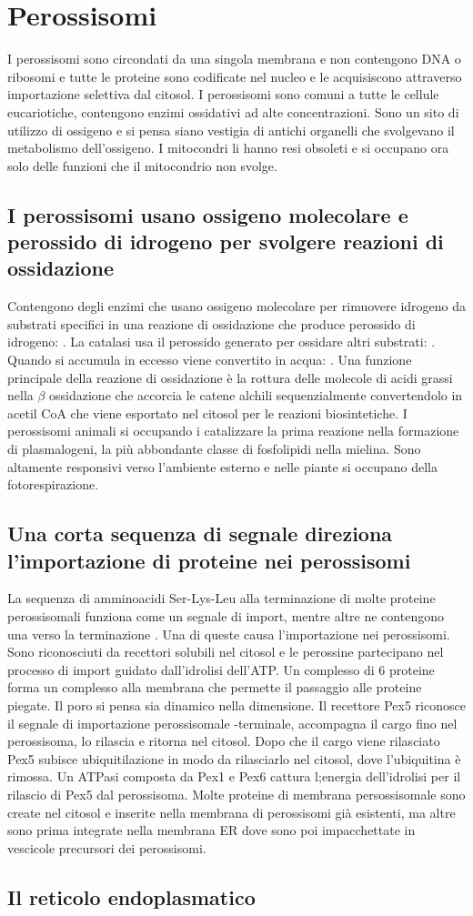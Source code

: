 \section{Perossisomi}
I perossisomi sono circondati da una singola membrana e non contengono DNA o ribosomi e tutte le proteine sono codificate nel nucleo e le acquisiscono attraverso importazione selettiva
dal citosol. I perossisomi sono comuni a tutte le cellule eucariotiche, contengono enzimi ossidativi ad alte concentrazioni. Sono un sito di utilizzo di ossigeno e si pensa siano
vestigia di antichi organelli che svolgevano il metabolismo dell'ossigeno. I mitocondri li hanno resi obsoleti e si occupano ora solo delle funzioni che il mitocondrio non svolge.
\subsection{I perossisomi usano ossigeno molecolare e perossido di idrogeno per svolgere reazioni di ossidazione}
Contengono degli enzimi che usano ossigeno molecolare per rimuovere idrogeno da substrati specifici in una reazione di ossidazione che produce perossido di idrogeno: . La catalasi usa il perossido generato per ossidare altri substrati: . Quando  si accumula in eccesso viene convertito in acqua:
. Una funzione principale della reazione di ossidazione \`e la rottura delle molecole di acidi grassi nella $\beta$ ossidazione che accorcia le catene alchili
sequenzialmente convertendolo in acetil CoA che viene esportato nel citosol per le reazioni biosintetiche. I perossisomi animali si occupando i catalizzare la prima reazione nella 
formazione di plasmalogeni, la pi\`u abbondante classe di fosfolipidi nella mielina. Sono altamente responsivi verso l'ambiente esterno e nelle piante si occupano della 
fotorespirazione. 
\subsection{Una corta sequenza di segnale direziona l'importazione di proteine nei perossisomi}
La sequenza di amminoacidi Ser-Lys-Leu alla terminazione  di molte proteine perossisomali funziona come un segnale di import, mentre altre ne contengono una verso la terminazione
. Una di queste causa l'importazione nei perossisomi. Sono riconosciuti da recettori solubili nel citosol e le perossine partecipano nel processo di import guidato dall'idrolisi
dell'ATP. Un complesso di $6$ proteine forma un complesso alla membrana che permette il passaggio alle proteine piegate. Il poro si pensa sia dinamico nella dimensione. Il recettore 
Pex5 riconosce il segnale di importazione perossisomale -terminale, accompagna il cargo fino nel perossisoma, lo rilascia e ritorna nel citosol. Dopo che il cargo viene rilasciato
Pex5 subisce ubiquitilazione in modo da rilasciarlo nel citosol, dove l'ubiquitina \`e rimossa. Un ATPasi composta da Pex1 e Pex6 cattura l;energia dell'idrolisi per il rilascio di Pex5
dal perossisoma. Molte proteine di membrana persossisomale sono create nel citosol e inserite nella membrana di perossisomi gi\`a esistenti, ma altre sono prima integrate nella membrana
ER dove sono poi impacchettate in vescicole precursori dei perossisomi. 
\subsection{Il reticolo endoplasmatico}
